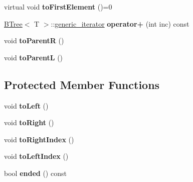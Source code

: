 \begin{DoxyCompactItemize}
\item 
\hypertarget{classBTree_1_1generic__iterator_abf7367ed0777041e701b233767627301}{
virtual void {\bfseries toFirstElement} ()=0}
\label{classBTree_1_1generic__iterator_abf7367ed0777041e701b233767627301}

\item 
\hypertarget{classBTree_1_1generic__iterator_a8ab57146bda370be5ca82da94c9251b0}{
\hyperlink{classBTree}{BTree}$<$ T $>$::\hyperlink{classBTree_1_1generic__iterator}{generic\_\-iterator} {\bfseries operator+} (int inc) const }
\label{classBTree_1_1generic__iterator_a8ab57146bda370be5ca82da94c9251b0}

\item 
\hypertarget{classBTree_1_1generic__iterator_a62df4bb204cea8a0af97e19ccc160e8e}{
void {\bfseries toParentR} ()}
\label{classBTree_1_1generic__iterator_a62df4bb204cea8a0af97e19ccc160e8e}

\item 
\hypertarget{classBTree_1_1generic__iterator_abfeda8b1d2dae72966f32cbd992beacd}{
void {\bfseries toParentL} ()}
\label{classBTree_1_1generic__iterator_abfeda8b1d2dae72966f32cbd992beacd}

\end{DoxyCompactItemize}
\subsection*{Protected Member Functions}
\begin{DoxyCompactItemize}
\item 
\hypertarget{classBTree_1_1generic__iterator_a1caabee0f2d858286f54209c41bd3fe5}{
void {\bfseries toLeft} ()}
\label{classBTree_1_1generic__iterator_a1caabee0f2d858286f54209c41bd3fe5}

\item 
\hypertarget{classBTree_1_1generic__iterator_a21fb2eb4d1c813608ea5e85e867e4eed}{
void {\bfseries toRight} ()}
\label{classBTree_1_1generic__iterator_a21fb2eb4d1c813608ea5e85e867e4eed}

\item 
\hypertarget{classBTree_1_1generic__iterator_a309a884dc8a33b063ad98e4e8936b703}{
void {\bfseries toRightIndex} ()}
\label{classBTree_1_1generic__iterator_a309a884dc8a33b063ad98e4e8936b703}

\item 
\hypertarget{classBTree_1_1generic__iterator_a13d16c4e3c5a5214c700173fbfb7ff46}{
void {\bfseries toLeftIndex} ()}
\label{classBTree_1_1generic__iterator_a13d16c4e3c5a5214c700173fbfb7ff46}

\item 
\hypertarget{classBTree_1_1generic__iterator_add47bfea959c0ec70023b39402fe1a7d}{
bool {\bfseries ended} () const }
\label{classBTree_1_1generic__iterator_add47bfea959c0ec70023b39402fe1a7d}

\end{DoxyCompactItemize}
